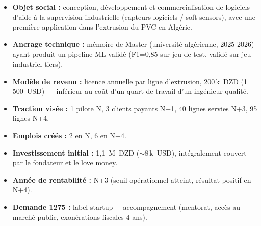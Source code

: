 \documentclass[11pt,a4paper]{article}
\begin{document}
\begin{itemize}\itemsep2pt
  \item \textbf{Objet social :} conception, développement et commercialisation de logiciels d'aide à la supervision industrielle (capteurs logiciels / soft-sensors), avec une première application dans l'extrusion du PVC en Algérie.
  \item \textbf{Ancrage technique :} mémoire de Master (université algérienne, 2025-2026) ayant produit un pipeline ML validé (F1=0{,}85 sur jeu de test, validé sur jeu industriel tiers).
  \item \textbf{Modèle de revenu :} licence annuelle par ligne d'extrusion, 200\,k~DZD (1\,500~USD) — inférieur au coût d'un quart de travail d'un ingénieur qualité.
  \item \textbf{Traction visée :} 1 pilote N, 3 clients payants N+1, 40 lignes servies N+3, 95 lignes N+4.
  \item \textbf{Emplois créés :} 2 en N, 6 en N+4.
  \item \textbf{Investissement initial :} 1{,}1~M~DZD ($\sim$8\,k~USD), intégralement couvert par le fondateur et le love money.
  \item \textbf{Année de rentabilité :} N+3 (seuil opérationnel atteint, résultat positif en N+4).
  \item \textbf{Demande 1275 :} label startup + accompagnement (mentorat, accès au marché public, exonérations fiscales 4 ans).
\end{itemize}
\end{document}
